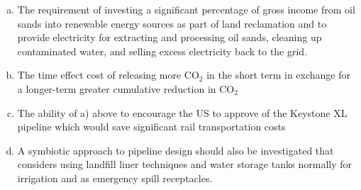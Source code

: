 \documentclass[11pt]{article}
\begin{document}
\begin{enumerate}[a)]
\item The requirement of investing a significant percentage of gross income from oil sands into renewable energy sources as part of land reclamation and to provide electricity for extracting and processing oil sands, cleaning up contaminated water, and selling excess electricity back to the grid. 
\item The time effect cost of releasing more CO$_2$ in the short term in exchange for a longer-term greater cumulative reduction in CO$_2$
\item The ability of a) above to encourage the US to approve of the Keystone XL pipeline which would save significant rail transportation costs
\item A symbiotic approach to pipeline design should also be investigated that considers using landfill liner techniques and water storage tanks normally for irrigation and as emergency spill receptacles.
\end{enumerate}

\newpage

\end{document}
